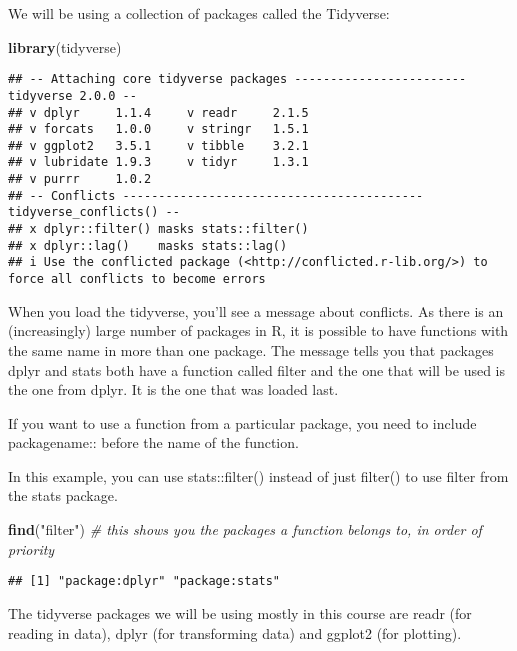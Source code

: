 \documentclass[
]{article}
\newenvironment{Shaded}{\begin{snugshade}}{\end{snugshade}}
\newcommand{\CommentTok}[1]{\textcolor[rgb]{0.56,0.35,0.01}{\textit{#1}}}
\newcommand{\FunctionTok}[1]{\textcolor[rgb]{0.13,0.29,0.53}{\textbf{#1}}}
\newcommand{\NormalTok}[1]{#1}
\newcommand{\StringTok}[1]{\textcolor[rgb]{0.31,0.60,0.02}{#1}}
\begin{document}
We will be using a collection of packages called the Tidyverse:

\begin{Shaded}
\begin{Highlighting}[]
\FunctionTok{library}\NormalTok{(tidyverse)}
\end{Highlighting}
\end{Shaded}

\begin{verbatim}
## -- Attaching core tidyverse packages ------------------------ tidyverse 2.0.0 --
## v dplyr     1.1.4     v readr     2.1.5
## v forcats   1.0.0     v stringr   1.5.1
## v ggplot2   3.5.1     v tibble    3.2.1
## v lubridate 1.9.3     v tidyr     1.3.1
## v purrr     1.0.2     
## -- Conflicts ------------------------------------------ tidyverse_conflicts() --
## x dplyr::filter() masks stats::filter()
## x dplyr::lag()    masks stats::lag()
## i Use the conflicted package (<http://conflicted.r-lib.org/>) to force all conflicts to become errors
\end{verbatim}

When you load the tidyverse, you'll see a message about conflicts. As
there is an (increasingly) large number of packages in R, it is possible
to have functions with the same name in more than one package. The
message tells you that packages dplyr and stats both have a function
called filter and the one that will be used is the one from dplyr. It is
the one that was loaded last.

If you want to use a function from a particular package, you need to
include packagename:: before the name of the function.

In this example, you can use stats::filter() instead of just filter() to
use filter from the stats package.

\begin{Shaded}
\begin{Highlighting}[]
\FunctionTok{find}\NormalTok{(}\StringTok{"filter"}\NormalTok{) }\CommentTok{\# this shows you the packages a function belongs to, in order of priority}
\end{Highlighting}
\end{Shaded}

\begin{verbatim}
## [1] "package:dplyr" "package:stats"
\end{verbatim}

The tidyverse packages we will be using mostly in this course are readr
(for reading in data), dplyr (for transforming data) and ggplot2 (for
plotting).
\end{document}
